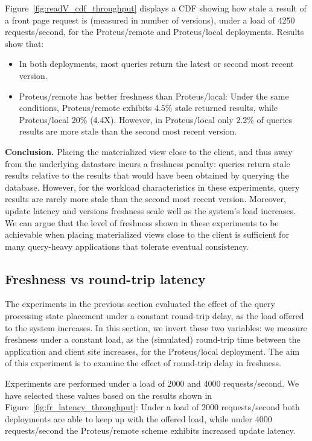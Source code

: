 Figure~\ref{fig:readV_cdf_throughput} displays a CDF showing how stale a result of a front page request is
(measured in number of versions),
under a load of 4250 requests/second, for the Proteus/remote and Proteus/local deployments.
Results show that:
\begin{itemize}
  \item In both deployments, most queries return the latest or second most recent version.
  \item Proteus/remote has better freshness than Proteus/local:
  Under the same conditions, Proteus/remote exhibits 4.5\% stale returned results,
  while Proteus/local 20\% (4.4X).
  However, in Proteus/local only 2.2\% of queries results are more stale than the second most recent version.
\end{itemize}

\medskip
\noindent
\textbf{Conclusion.}
Placing the materialized view close to the client, and thus away from the underlying datastore incurs a freshness penalty:
queries return stale results relative to the results that would have been obtained by querying the database.
However, for the workload characteristics in these experiments,
query results are rarely more stale than the second most recent version.
Moreover, update latency and versions freshness scale well as the system's load increases.
We can argue that the level of freshness shown in these experiments to be achievable when placing materialized views close
to the client is sufficient for many query-heavy applications that tolerate eventual consistency.

\subsection{Freshness vs round-trip latency}
\label{sec:eval_freshness_rtt}

The experiments in the previous section evaluated the effect of the query processing state placement under a constant
round-trip delay, as the load offered to the system increases.
In this section, we invert these two variables:
we measure freshness under a constant load,
as the (simulated) round-trip time between the application and client site increases,
for the Proteus/local deployment.
The aim of this experiment is to examine the effect of round-trip delay in freshness.

Experiments are performed under a load of 2000 and 4000 requests/second.
We have selected these values based on the results shown in Figure~\ref{fig:fr_latency_throughput}:
Under a load of 2000 requests/second both deployments are able to keep up with the offered load,
while under 4000 requests/second the Proteus/remote scheme exhibits increased update latency.

